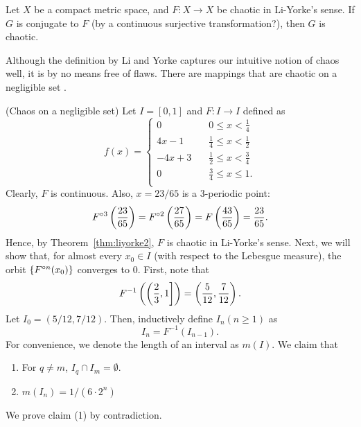\documentclass[12pt,draft,twoside]{book}
\begin{document}
\begin{conjecture}
  Let $X$ be a compact metric space, and $F: X\to X$ be chaotic in Li-Yorke's sense.
  If $G$ is conjugate to $F$ (by a continuous surjective transformation?), then $G$ is chaotic.
\end{conjecture}

Although the definition by Li and Yorke captures our intuitive notion of chaos well, it is by no means free of flaws.
There are mappings that are chaotic on a negligible set \citep{martelli98}.
\begin{example}
  (Chaos on a negligible set)
  Let $I = [0,1]$ and $F: I \to I$ defined as
  \begin{equation*}
    f(x) =
    \begin{cases}
      0 \quad & 0\leq x < \frac{1}{4} \\
      4x - 1 \quad  & \frac{1}{4} \leq x < \frac{1}{2} \\
      -4x + 3 \quad & \frac{1}{2} \leq x < \frac{3}{4} \\
      0 \quad & \frac{3}{4} \leq x \leq 1. \\
    \end{cases}
  \end{equation*}
  Clearly, $F$ is continuous.
  Also, $x = 23/65$ is a 3-periodic point:
  \begin{equation*}
    F^{\circ 3}\left ( \frac{23}{65} \right ) = F^{\circ 2}\left ( \frac{27}{65} \right ) = F\left ( \frac{43}{65} \right ) = \frac{23}{65}.
  \end{equation*}
Hence, by Theorem~\ref{thm:liyorke2}, $F$ is chaotic in Li-Yorke's sense.
%
Next, we will show that, for almost every $x_0 \in I$ (with respect to the Lebesgue measure), the orbit $\left \{ F^{\circ n}(x_0) \right \}$ converges to 0.
First, note that 
\begin{equation*}
  F^{-1}\left ( \left(\frac{2}{3},1\right] \right ) 
  = \left ( \frac{5}{12},\frac{7}{12} \right ).
\end{equation*}
Let $I_0 = (5/12, 7/12)$.
Then, inductively define $I_n (n\geq 1)$ as 
\begin{equation*}
  I_n = F^{-1}(I_{n-1}).
\end{equation*}
%
For convenience, we denote the length of an interval as $m(I)$.
We claim that
\begin{enumerate}[(1)]
  \item For $q\neq m$, $I_q \cap I_m = \emptyset$.
  \item $m(I_n) = 1/(6 \cdot 2^n)$
\end{enumerate}
%
We prove claim (1) by contradiction.

\end{example}
\end{document}
